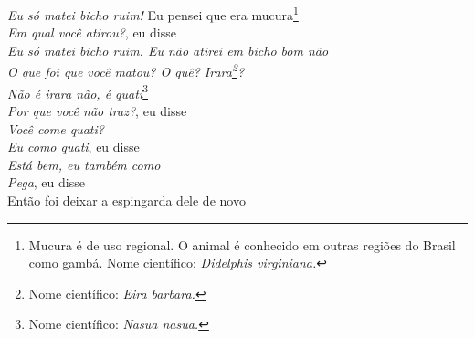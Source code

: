 \begin{linenumbers}\begingroup\raggedright
 
\noindent   \textit{Eu só matei bicho ruim!}
  Eu pensei que era mucura\footnote{Mucura é de uso regional. O animal é conhecido em outras regiões do Brasil como gambá. Nome científico: \textit{Didelphis virginiana.}}\\ %
  \textit{Em qual você atirou?}, eu disse\\
  \textit{Eu só matei bicho ruim. Eu não atirei em bicho bom não}\\
  \textit{O que foi que você matou? O quê? Irara\footnote{Nome científico: \textit{Eira barbara.}}?}\\
  \textit{Não é irara não, é quati}\footnote{Nome científico: \textit{Nasua nasua.}}\\
  \textit{Por que você não traz?}, eu disse\\
  \textit{Você come quati?}\\
  \textit{Eu como quati}, eu disse\\
  \textit{Está bem, eu também como}\\
  \textit{Pega}, eu disse\\
  Então foi deixar a espingarda dele de novo
 
\end{linenumbers}\endgroup

\bigskip

